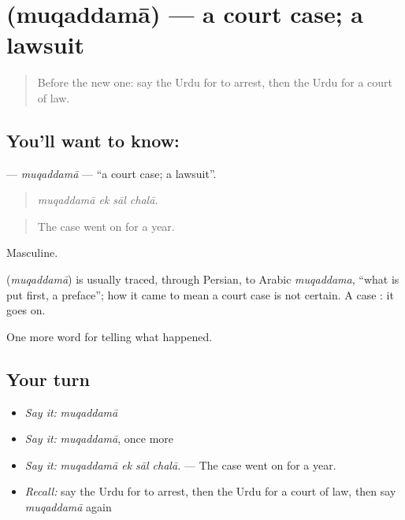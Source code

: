 \section[\texorpdfstring{\ur{مقدمہ} (muqaddamā)}{مقدمہ (muqaddamā)}]{ (muqaddamā) — a court case; a lawsuit}

\label{lesson:UR-C283-muqaddama}



\begin{quote}
Before the new one: say the Urdu for to arrest, then the Urdu for a court of law.
\end{quote}

\subsection*{You'll want to know: }
\textbf{} — \emph{muqaddamā} — \textquotedblleft{}a court case; a lawsuit\textquotedblright{}.

\begin{quote}
   
\end{quote}

\begin{quote}
\emph{muqaddamā ek sāl chalā.}
\end{quote}

\begin{quote}
The case went on for a year.
\end{quote}

Masculine.

\begin{cousinweb}
\textbf{} (\emph{muqaddamā}) is usually traced, through Persian, to Arabic \emph{muqaddama}, \textquotedblleft{}what is put first, a preface\textquotedblright{}; how it came to mean a court case is not certain. A case \textbf{ }: it goes on.
\end{cousinweb}

\begin{grammarlens}[title={What you've built}]
One more word for telling what happened.
\end{grammarlens}

\subsection*{Your turn}
\begin{itemize}
\raggedright
  \item \emph{Say it:} \emph{muqaddamā}
  \item \emph{Say it:} \emph{muqaddamā}, once more
  \item \emph{Say it:} \emph{muqaddamā ek sāl chalā.} — The case went on for a year.
  \item \emph{Recall:} say the Urdu for to arrest, then the Urdu for a court of law, then say \emph{muqaddamā} again
\end{itemize}

